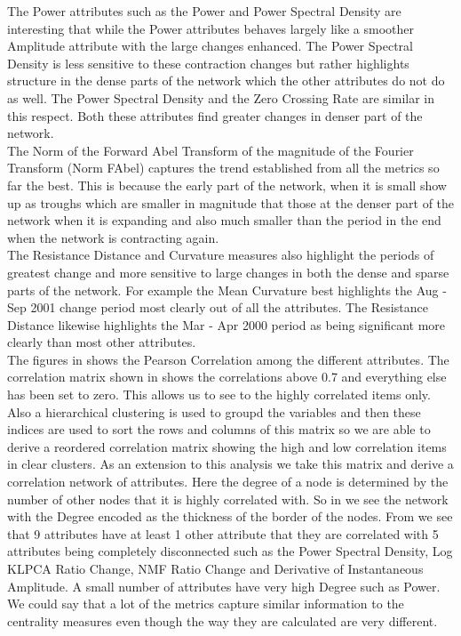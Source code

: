 The Power attributes such as the Power and Power Spectral Density are interesting that while the Power attributes behaves largely like a smoother Amplitude attribute with the large changes enhanced. The Power Spectral Density is less sensitive to these contraction changes but rather highlights structure in the dense parts of the network which the other attributes do not do as well. The Power Spectral Density and the Zero Crossing Rate are similar in this respect. Both these attributes find greater changes in denser part of the network. \\

The Norm of the Forward Abel Transform of the magnitude of the Fourier Transform (Norm FAbel) captures the trend established from all the metrics so far the best. This is because the early part of the network, when it is small show up as troughs which are smaller in magnitude that those at the denser part of the network when it is expanding and also much smaller than the period in the end when the network is contracting again. \\

The Resistance Distance and Curvature measures also highlight the periods of greatest change and more sensitive to large changes in both the dense and sparse parts of the network. For example the Mean Curvature best highlights the Aug -  Sep 2001 change period most clearly out of all the attributes. The Resistance Distance likewise highlights the Mar - Apr 2000 period as being significant more clearly than most other attributes.\\

The figures in  shows the Pearson Correlation among the different attributes. The correlation matrix shown in  shows the correlations above 0.7 and everything else has been set to zero. This allows us to see to the highly correlated items only. Also a hierarchical clustering is used to groupd the variables and then these indices are used to sort the rows and columns of this matrix so we are able to derive a reordered correlation matrix showing the high and low correlation items in clear clusters. As an extension to this analysis we take this matrix and derive a correlation network of attributes. Here the degree of a node is determined by the number of other nodes that it is highly correlated with. So in  we see the network with the Degree encoded as the thickness of the border of the nodes. From  we see that 9 attributes have at least 1 other attribute that they are correlated with 5 attributes being completely disconnected such as the Power Spectral Density, Log KLPCA Ratio Change, NMF Ratio Change and Derivative of Instantaneous Amplitude. A small number of attributes have very high Degree such as Power. We could say that a lot of the metrics capture similar information to the centrality measures even though the way they are calculated are very different. \\


